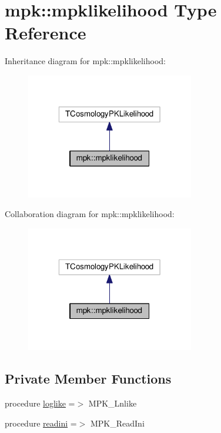 \hypertarget{structmpk_1_1mpklikelihood}{}\section{mpk\+:\+:mpklikelihood Type Reference}
\label{structmpk_1_1mpklikelihood}


Inheritance diagram for mpk\+:\+:mpklikelihood\+:
\nopagebreak
\begin{figure}[H]
\begin{center}
\leavevmode
\includegraphics[width=208pt]{structmpk_1_1mpklikelihood__inherit__graph}
\end{center}
\end{figure}


Collaboration diagram for mpk\+:\+:mpklikelihood\+:
\nopagebreak
\begin{figure}[H]
\begin{center}
\leavevmode
\includegraphics[width=208pt]{structmpk_1_1mpklikelihood__coll__graph}
\end{center}
\end{figure}
\subsection*{Private Member Functions}
\begin{DoxyCompactItemize}
\item 
procedure \mbox{\hyperlink{structmpk_1_1mpklikelihood_a0ab95ecb535693d628ac8165ad3bf841}{loglike}} =$>$ M\+P\+K\+\_\+\+Lnlike
\item 
procedure \mbox{\hyperlink{structmpk_1_1mpklikelihood_acca54e95ba2e1da04687a8f9691586e8}{readini}} =$>$ M\+P\+K\+\_\+\+Read\+Ini
\end{DoxyCompactItemize}
